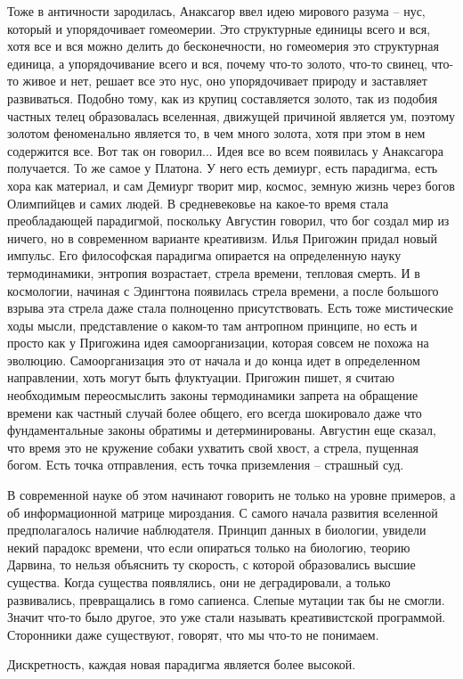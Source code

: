\documentclass[a4paper, 12pt]{article}
\begin{document}
\begin{itemize}
    Тоже в античности зародилась, Анаксагор ввел идею мирового разума -- 
    нус, который и упорядочивает гомеомерии. Это структурные единицы 
    всего и вся, хотя все и вся можно делить до бесконечности, но 
    гомеомерия это структурная единица, а упорядочивание всего и вся, 
    почему что-то золото, что-то свинец, что-то живое и нет, решает все 
    это нус, оно упорядочивает природу и заставляет развиваться. Подобно 
    тому, как из крупиц составляется золото, так из подобия частных 
    телец образовалась вселенная, движущей причиной является ум, поэтому 
    золотом феноменально является то, в чем много золота, хотя при этом 
    в нем содержится все. Вот так он говорил... Идея все во всем 
    появилась у Анаксагора получается. То же самое у Платона. У него 
    есть демиург, есть парадигма, есть хора как материал, и сам Демиург 
    творит мир, космос, земную жизнь через богов Олимпийцев и самих 
    людей. В средневековье на какое-то время стала преобладающей 
    парадигмой, поскольку Августин говорил, что бог создал мир из 
    ничего, но в современном варианте креативизм. Илья Пригожин придал 
    новый импульс. Его философская парадигма опирается на определенную 
    науку термодинамики, энтропия возрастает, стрела времени, тепловая 
    смерть. И в космологии, начиная с Эдингтона появилась стрела 
    времени, а после большого взрыва эта стрела даже стала полноценно 
    присутствовать. Есть тоже мистические ходы мысли, представление 
    о каком-то там антропном принципе, но есть и просто как у Пригожина 
    идея самоорганизации, которая совсем не похожа на эволюцию. 
    Самоорганизация это от начала и до конца идет в определенном 
    направлении, хоть могут быть флуктуации. Пригожин пишет, я считаю 
    необходимым переосмыслить законы термодинамики запрета на обращение 
    времени как частный случай более общего, его всегда шокировало даже 
    что фундаментальные законы обратимы и детерминированы. Августин еще 
    сказал, что время это не кружение собаки ухватить свой хвост, 
    а стрела, пущенная богом. Есть точка отправления, есть точка 
    приземления -- страшный суд.

    В современной науке об этом начинают говорить не только на уровне 
    примеров, а об информационной матрице мироздания. С самого начала 
    развития вселенной предполагалось наличие наблюдателя. Принцип 
    данных в биологии, увидели некий парадокс времени, что если 
    опираться только на биологию, теорию Дарвина, то нельзя объяснить ту 
    скорость, с которой образовались высшие существа. Когда существа 
    появлялись, они не деградировали, а только развивались, превращались 
    в гомо сапиенса. Слепые мутации так бы не смогли. Значит что-то было 
    другое, это уже стали называть креативистской программой. Сторонники 
    даже существуют, говорят, что мы что-то не понимаем.
\end{itemize}
Дискретность, каждая новая парадигма является более высокой.
\end{document}
